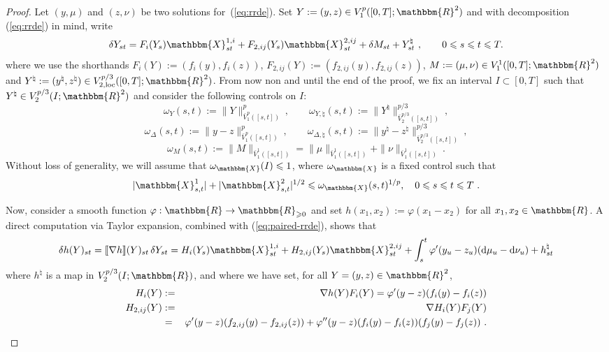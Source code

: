 \documentclass[11pt,reqno,oneside]{amsart}
\numberwithin{equation}{section}
\newcommand{\assign}{:=}
\newcommand{\mathd}{\mathrm{d}}
\begin{document}
\begin{proof}
  Let $(y, \mu)$ and $(z, \nu)$ be two solutions for~(\ref{eq:rrde}).
 Set $Y \assign (y, z) \in V^p_1
  ([0, T] ; \mathbbm{R}^2)$ and with decomposition (\ref{eq:rrde}) in mind, write 
  \begin{equation}
    \delta Y_{s t} = F_i (Y_s) \mathbbm{X}^{1,i}_{s t} + F_{2,ij} (Y_s) \mathbbm{X}^{2,ij}_{s
    t} + \delta M_{st}+ Y^{\natural}_{s t}  \ , \qquad 0 \leqslant s \leqslant t
    \leqslant T. \label{eq:paired-rrde}
  \end{equation}
where we use the shorthands $F_i (Y) \assign (f_i (y), f_i (z))$, $F_{2,ij} (Y) \assign (f_{2,ij} (y), f_{2,ij} (z))$, $M \assign (\mu, \nu)\in V^1_1
  ([0, T] ; \mathbbm{R}^2)$ and $Y^\natural\assign (y^\natural,z^\natural)\in V^{p/3}_{2,\text{loc}}([0, T] ; \mathbbm{R}^2)$. From now non and until the end of the proof, we fix an interval $I\subset [0,T]$ such that $Y^\natural\in V^{p/3}_{2}(I; \mathbbm{R}^2)$ and consider the following controls on $I$:
$$\omega_Y (s, t)\assign \| Y \|_{\bar{V}^p_1 ([s,t] )}^p \ , \qquad  \omega_{Y,\natural} (s, t) \assign \| Y^\natural \|_{\bar{V}^{p/3}_2 ([s,t] )}^{p/3} \ , $$
$$ \omega_\Delta (s, t)\assign \| y-z \|_{\bar{V}^p_1 ([s,t] )}^p\ , \qquad \omega_{\Delta, \natural} (s, t)\assign \| y^\natural-z^\natural \|_{\bar{V}^{p/3}_2 ([s,t] )}^{p/3} \ ,$$
$$ \omega_M (s, t)\assign \| M \|_{\bar{V}^1_1 ([s,t] )}=\| \mu \|_{\bar{V}^1_1 ([s,t] )} +\| \nu\|_{\bar{V}^1_1 ([s,t] )}\ .$$
Without loss of generality, we will assume that $\omega_{\mathbbm{X}}(I)\leqslant 1$, where $\omega_{\mathbbm{X}}$ is a fixed control such that
  \[ | \mathbbm{X}^1_{s, t} | + | \mathbbm{X}^2_{s, t} |^{1 / 2}
     \leqslant \omega_{\mathbbm{X}} (s, t)^{1 / p}, \quad 0 \leqslant s
     \leqslant t \leqslant T \ . \]
		
\smallskip
		
\noindent		
Now, consider a smooth function $\varphi : \mathbbm{R} 
  \rightarrow \mathbbm{R}_{\geqslant 0}$ and set $h (x_1, x_2) \assign \varphi (x_1
  - x_2)$ for all $x_1,x_2 \in \mathbbm{R}$. A direct computation via Taylor expansion, combined with (\ref{eq:paired-rrde}), shows that 
  \begin{equation}
    \delta h (Y)_{s t} = \llbracket \nabla h\rrbracket (Y)_{st}\, \delta Y_{st}=H_i (Y_s) \mathbbm{X}^{1,i}_{s t} + H_{2,ij} (Y_s)
    \mathbbm{X}^{2,ij}_{s t}  + \int_s^t \varphi' (y_u - z_u) (\mathd \mu_u - \mathd \nu_u)+ h^{\natural}_{s t}
    \label{eq:h-dyn}
  \end{equation}
  where $h^{\natural}$ is a map in $V^{p/3}_{2}(I; \mathbbm{R})$, and where we have set, for all $Y=(y,z)\in \mathbbm{R}^2$,
\begin{eqnarray}
H_i (Y) &\assign& \nabla h (Y)F_i(Y)= \varphi' (y - z) (f_i (y) - f_i (z)) \label{eq:def-H}\\
H_{2,ij} (Y) &\assign& \nabla H_i (Y) F_j (Y) \notag\\
&=&\varphi' (y - z) (f_{2,ij} (y) - f_{2,ij} (z)) 
+\varphi'' (y - z) (f_i (y) - f_i (z))(f_j (y) - f_j (z)) \ . \label{eq:def-H-2}
\end{eqnarray}


\end{proof}
\end{document}
